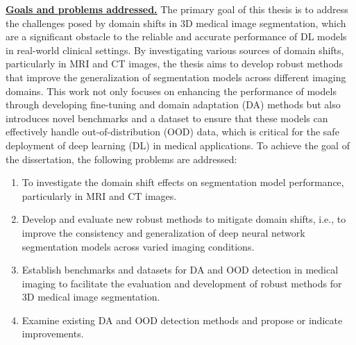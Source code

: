 \underline{\textbf{Goals and problems addressed.}}
The primary goal of this thesis is to address the challenges posed by domain shifts in 3D medical image segmentation, which are a significant obstacle to the reliable and accurate performance of DL models in real-world clinical settings. By investigating various sources of domain shifts, particularly in MRI and CT images, the thesis aims to develop robust methods that improve the generalization of segmentation models across different imaging domains. This work not only focuses on enhancing the performance of models through developing fine-tuning and domain adaptation (DA) methods but also introduces novel benchmarks and a dataset to ensure that these models can effectively handle out-of-distribution (OOD) data, which is critical for the safe deployment of deep learning (DL) in medical applications. To achieve the goal of the dissertation, the following problems are addressed:

\begin{enumerate}
    \item To investigate the domain shift effects on segmentation model performance, particularly in MRI and CT images.
    \item Develop and evaluate new robust methods to mitigate domain shifts, i.e., to improve the consistency and generalization of deep neural network segmentation models across varied imaging conditions.
    \item Establish benchmarks and datasets for DA and OOD detection in medical imaging to facilitate the evaluation and development of robust methods for 3D medical image segmentation.
    \item Examine existing DA and OOD detection methods and propose or indicate improvements.
\end{enumerate}


